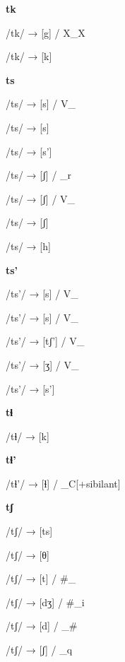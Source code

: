 \begin{center}\textbf{tk}\end{center}
\begin{multicols}{4}
\noindent /tk/ → [g] / X\_X

\noindent /tk/ → [k]

\end{multicols}

\begin{center}\textbf{ts}\end{center}
\begin{multicols}{4}
\noindent /ts/ → [s] / V\_

\noindent /ts/ → [s]

\noindent /ts/ → [s']

\noindent /ts/ → [ʃ] / \_r

\noindent /ts/ → [ʃ] / V\_

\noindent /ts/ → [ʃ]

\noindent /ts/ → [h]
\end{multicols}

\begin{center}\textbf{ts'}\end{center}
\begin{multicols}{4}
\noindent /ts'/ → [s] / V\_

\noindent /ts'/ → [s] / V\_

\noindent /ts'/ → [tʃ'] / V\_

\noindent /ts'/ → [ʒ] / V\_

\noindent /ts'/ → [s']
\end{multicols}

\begin{center}\textbf{tɬ}\end{center}
\begin{multicols}{4}
\noindent /tɬ/ → [k]
\end{multicols}


\begin{center}\textbf{tɬ'}\end{center}
\begin{multicols}{4}
\noindent /tɬ'/ → [ɬ] / \_C[+sibilant]
\end{multicols}


\begin{center}\textbf{tʃ}\end{center}
\begin{multicols}{4}
\noindent /tʃ/ → [ts]

\noindent /tʃ/ → [θ]

\noindent /tʃ/ → [t] / \#\_

\noindent /tʃ/ → [dʒ] / \#\_i

\noindent /tʃ/ → [d] / \_\#

\noindent /tʃ/ → [ʃ] / \_q

\end{multicols}

